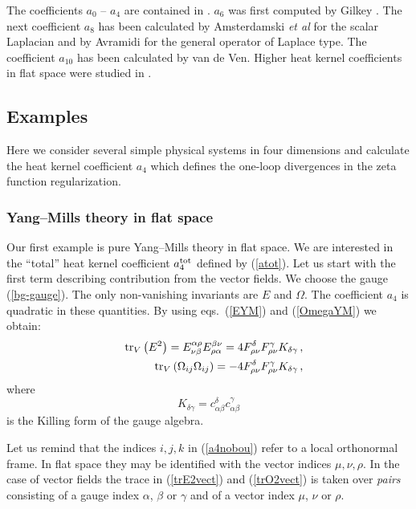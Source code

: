 The coefficients $a_0$ -- $a_4$ are contained in 
\cite{DeWitt:1965,McKean:1967}.
$a_6$ was first computed by Gilkey \cite{Gilkey1975}.
The next coefficient $a_8$ has been calculated by Amsterdamski
{\it et al} \cite{Amsterdamski:1989bt} for the scalar Laplacian
and by Avramidi \cite{Avramidi:1990ug,Avramidi:1991je} for
the general operator of Laplace type.
The coefficient $a_{10}$ has been calculated 
by van de Ven\cite{vandeVen:1997pf}.
Higher heat kernel coefficients in flat space were studied in
\cite{Fliegner:1995zc,Fliegner:1998rk}.
\subsection{Examples}\label{s4examples}
Here we consider several simple physical systems in four dimensions
and calculate the heat kernel coefficient $a_4$ which defines the
one-loop divergences in the zeta function regularization. 
\subsubsection{Yang--Mills theory in flat space}\label{s4YM}
Our first example is pure Yang--Mills theory in flat space. We are 
interested in the ``total'' heat kernel coefficient $a_4^{\rm tot}$
defined by (\ref{atot}). Let us start with the first term describing
contribution from the vector fields. We choose the gauge (\ref{bg-gauge}).
The only non-vanishing invariants are $E$ and $\Omega$. The coefficient
$a_4$ is quadratic in these quantities. By using eqs.\ (\ref{EYM})
and (\ref{OmegaYM}) we obtain:
\begin{eqnarray}
&&{\rm tr}_V \left( E^2\right)=E_{\nu\beta}^{\alpha\rho}E_{\rho\alpha}^{\beta\nu}=
4 F_{\rho\nu}^\delta F_{\rho\nu}^\gamma K_{\delta\gamma} \,,
\label{trE2vect} \\
&&{\rm tr}_V \left( \Omega_{ij} \Omega_{ij} \right) = 
-4 F_{\rho\nu}^\delta F_{\rho\nu}^\gamma K_{\delta\gamma} \,,
\label{trO2vect}
\end{eqnarray} 
where 
\begin{equation}
K_{\delta\gamma}=c_{\alpha\beta}^{\delta}c_{\alpha\beta}^{\gamma} 
\label{Killform}
\end{equation}
is the Killing form of the gauge algebra.

Let us remind that the indices $i,j,k$ in (\ref{a4nobou}) refer to a local
orthonormal frame. In flat space they may be identified with the
vector indices $\mu,\nu,\rho$. In the case of vector fields the trace
in (\ref{trE2vect}) and (\ref{trO2vect}) is taken over {\it pairs}
consisting of a gauge index $\alpha$, $\beta$ or $\gamma$ and of a
vector index $\mu$, $\nu$ or $\rho$.

